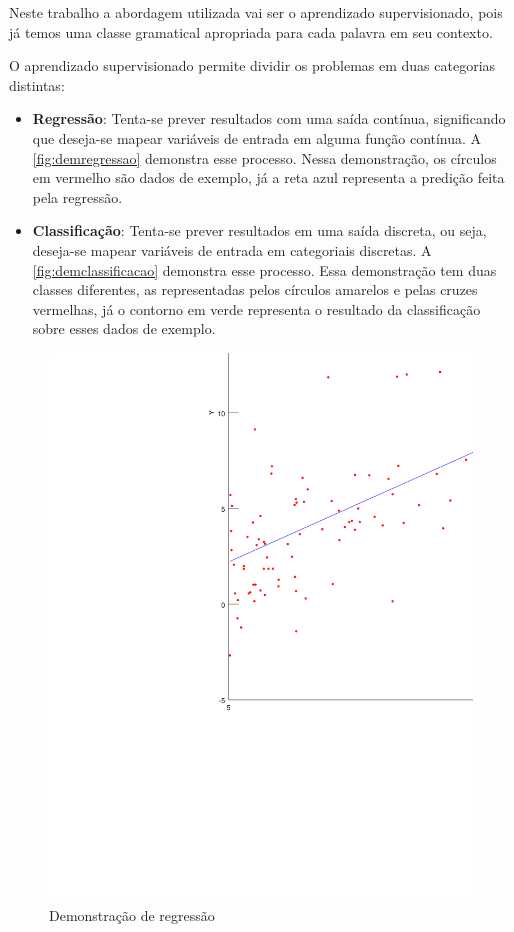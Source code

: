 Neste trabalho a abordagem utilizada vai ser o aprendizado supervisionado, pois já temos uma classe gramatical apropriada para cada palavra em seu contexto.

O aprendizado supervisionado permite dividir os problemas em duas categorias distintas:


\begin{itemize}
	\item \textbf{Regressão}: Tenta-se prever resultados com uma saída contínua, significando que deseja-se mapear variáveis de entrada em alguma função contínua. A \autoref{fig:demregressao} demonstra esse processo. Nessa demonstração, os círculos em vermelho são dados de exemplo, já a reta azul representa a predição feita pela regressão.
	\item \textbf{Classificação}:  Tenta-se prever resultados em uma saída discreta, ou seja, deseja-se mapear variáveis de entrada em categoriais discretas. A \autoref{fig:demclassificacao} demonstra esse processo. Essa demonstração tem duas classes diferentes, as representadas pelos círculos amarelos e pelas cruzes vermelhas, já o contorno em verde representa o resultado da classificação sobre esses dados de exemplo.
\end{itemize}


\begin{figure}[htb]
	  \caption{Demonstração de regressão}\label{fig:demregressao}
	  \begin{center}
	      \includegraphics[scale=0.75]{img/regressao2}
	  \end{center}
\end{figure}

